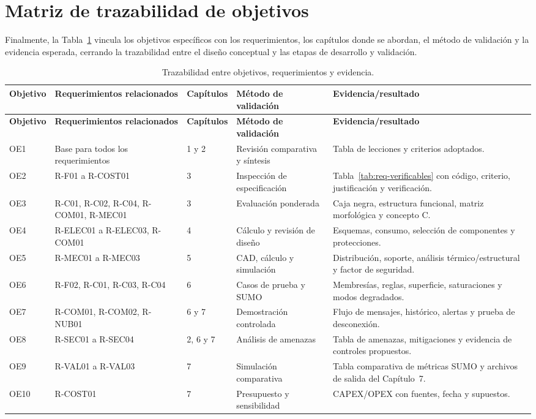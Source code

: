 \section{Matriz de trazabilidad de objetivos}\label{sec:trazabilidad-objetivos}

Finalmente, la Tabla~\ref{tab:trazabilidad} vincula los objetivos específicos con los requerimientos, los
capítulos donde se abordan, el método de validación y la evidencia esperada, cerrando la trazabilidad entre el
diseño conceptual y las etapas de desarrollo y validación.

\begin{landscape}
\footnotesize
\begin{longtable}{@{}p{1.3cm}p{4.3cm}p{2.6cm}p{3.7cm}p{7.0cm}@{}}
\caption{Trazabilidad entre objetivos, requerimientos y evidencia.}\label{tab:trazabilidad}\\
\toprule
\textbf{Objetivo} & \textbf{Requerimientos relacionados} & \textbf{Capítulos} & \textbf{Método de validación} & \textbf{Evidencia/resultado}\\
\midrule
\endfirsthead
\toprule
\textbf{Objetivo} & \textbf{Requerimientos relacionados} & \textbf{Capítulos} & \textbf{Método de validación} & \textbf{Evidencia/resultado}\\
\midrule
\endhead
\bottomrule
\endfoot
OE1 & Base para todos los requerimientos & 1 y 2 & Revisión comparativa y síntesis & Tabla de lecciones y criterios adoptados.\\
OE2 & R-F01 a R-COST01 & 3 & Inspección de especificación & Tabla~\ref{tab:req-verificables} con código, criterio, justificación y verificación.\\
OE3 & R-C01, R-C02, R-C04, R-COM01, R-MEC01 & 3 & Evaluación ponderada & Caja negra, estructura funcional, matriz morfológica y concepto C.\\
OE4 & R-ELEC01 a R-ELEC03, R-COM01 & 4 & Cálculo y revisión de diseño & Esquemas, consumo, selección de componentes y protecciones.\\
OE5 & R-MEC01 a R-MEC03 & 5 & CAD, cálculo y simulación & Distribución, soporte, análisis térmico/estructural y factor de seguridad.\\
OE6 & R-F02, R-C01, R-C03, R-C04 & 6 & Casos de prueba y SUMO & Membresías, reglas, superficie, saturaciones y modos degradados.\\
OE7 & R-COM01, R-COM02, R-NUB01 & 6 y 7 & Demostración controlada & Flujo de mensajes, histórico, alertas y prueba de desconexión.\\
OE8 & R-SEC01 a R-SEC04 & 2, 6 y 7 & Análisis de amenazas & Tabla de amenazas, mitigaciones y evidencia de controles propuestos.\\
OE9 & R-VAL01 a R-VAL03 & 7 & Simulación comparativa & Tabla comparativa de métricas SUMO y archivos de salida del Capítulo~7.\\
OE10 & R-COST01 & 7 & Presupuesto y sensibilidad & CAPEX/OPEX con fuentes, fecha y supuestos.\\
\bottomrule
\end{longtable}
\end{landscape}
